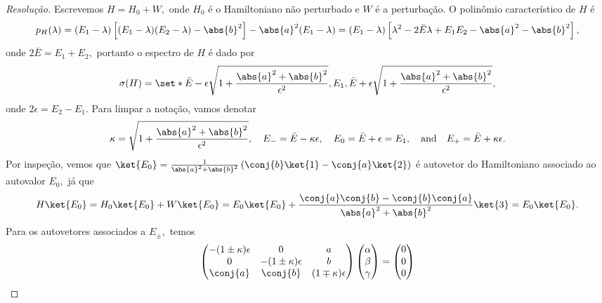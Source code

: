 \begin{proof}[Resolução]
    Escrevemos \(H = H_0 + W,\) onde \(H_0\) é o Hamiltoniano não perturbado e \(W\) é a perturbação. O polinômio característico de \(H\) é
    \begin{equation*}
        p_H(\lambda) = (E_1 - \lambda) \left[(E_1 - \lambda) (E_2 - \lambda) - \abs{b}^2\right] - \abs{a}^2 (E_1 - \lambda) = (E_1 - \lambda) \left[\lambda^2 - 2\bar{E} \lambda + E_1 E_2 - \abs{a}^2 - \abs{b}^2\right],
    \end{equation*}
    onde \(2\bar{E} = E_1 + E_2,\) portanto o espectro de \(H\) é dado por
    \begin{equation*}
        \sigma(H) = \set*{\bar{E} - \epsilon\sqrt{1 + \frac{\abs{a}^2 + \abs{b}^2}{\epsilon^2}}, E_1, \bar{E} + \epsilon\sqrt{1 + \frac{\abs{a}^2 + \abs{b}^2}{\epsilon^2}}},
    \end{equation*}
    onde \(2\epsilon = E_2 - E_1\). Para limpar a notação, vamos denotar 
    \begin{equation*}
        \kappa = \sqrt{1 + \frac{\abs{a}^2 + \abs{b}^2}{\epsilon^2}},\quad
        E_- = \bar{E} - \kappa \epsilon,\quad
        E_0 = \bar{E} + \epsilon = E_1,\quad\text{and}\quad
        E_+ = \bar{E} + \kappa \epsilon.
    \end{equation*}
    Por inspeção, vemos que \(\ket{E_0} = \frac{1}{\abs{a}^2 + \abs{b}^2}\left(\conj{b}\ket{1} - \conj{a}\ket{2}\right)\) é autovetor do Hamiltoniano associado ao autovalor \(E_0,\) já que
    \begin{equation*}
        H\ket{E_0} = H_0 \ket{E_0} + W\ket{E_0} = E_0 \ket{E_0} + \frac{\conj{a}\conj{b} - \conj{b}\conj{a}}{\abs{a}^2 + \abs{b}^2}\ket{3} = E_0 \ket{E_0}.
    \end{equation*}
    Para os autovetores associados a \(E_\pm,\) temos
    \begin{equation*}
        \begin{pmatrix}
            -(1 \pm \kappa) \epsilon & 0 & a\\
           0 & -(1 \pm \kappa) \epsilon& b\\
           \conj{a} & \conj{b} & (1 \mp \kappa) \epsilon
        \end{pmatrix}
        \begin{pmatrix}
            \alpha\\
            \beta\\
            \gamma
        \end{pmatrix} = \begin{pmatrix}
        0\\0\\0

\end{pmatrix}
\end{equation*}
\end{proof}
